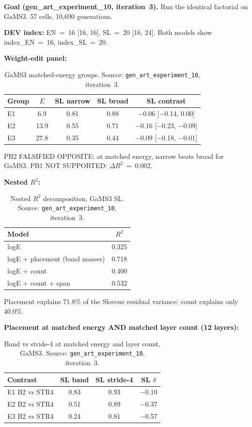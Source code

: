 \documentclass[11pt,letterpaper]{article}
\begin{document}
\textbf{Goal (gen\_art\_experiment\_10, iteration~3).} Run the identical factorial on GaMS3. 57 cells, 10,690 generations.

\textbf{DEV index:} EN~=~16 [16, 16], SL~=~20 [16, 24]. Both models show index\_EN~=~16, index\_SL~=~20.

\textbf{Weight-edit panel:}

\begin{table}[!htbp]
\centering
\caption{GaMS3 matched-energy groups. Source: \texttt{gen\_art\_experiment\_10}, iteration~3.}
\label{tab:exp10_matched}
\small
\begin{tabular}{lcccc}
\toprule
Group & $E$ & SL narrow & SL broad & SL contrast \\
\midrule
E1 & 6.9 & 0.81 & 0.88 & $-$0.06 [$-$0.14, 0.00] \\
E2 & 13.9 & 0.55 & 0.71 & $-$0.16 [$-$0.23, $-$0.09] \\
E3 & 27.8 & 0.35 & 0.44 & $-$0.09 [$-$0.18, $-$0.01] \\
\bottomrule
\end{tabular}
\end{table}

PB2 FALSIFIED OPPOSITE: at matched energy, narrow beats broad for GaMS3. PB1 NOT SUPPORTED: $\Delta R^2$~=~0.002.

\textbf{Nested $R^2$:}

\begin{table}[!htbp]
\centering
\caption{Nested $R^2$ decomposition, GaMS3 SL. Source: \texttt{gen\_art\_experiment\_10}, iteration~3.}
\label{tab:exp10_nested}
\small
\begin{tabular}{lc}
\toprule
Model & $R^2$ \\
\midrule
logE & 0.325 \\
logE + placement (band masses) & 0.718 \\
logE + count & 0.400 \\
logE + count + span & 0.532 \\
\bottomrule
\end{tabular}
\end{table}

Placement explains 71.8\% of the Slovene residual variance; count explains only 40.0\%.

\textbf{Placement at matched energy AND matched layer count (12 layers):}

\begin{table}[!htbp]
\centering
\caption{Band vs stride-4 at matched energy and layer count, GaMS3. Source: \texttt{gen\_art\_experiment\_10}, iteration~3.}
\label{tab:exp10_placement}
\small
\begin{tabular}{lccc}
\toprule
Contrast & SL band & SL stride-4 & SL $\delta$ \\
\midrule
E1 B2 vs STR4 & 0.83 & 0.93 & $-$0.10 \\
E2 B2 vs STR4 & 0.51 & 0.89 & $-$0.37 \\
E3 B2 vs STR4 & 0.24 & 0.81 & $-$0.57 \\
\bottomrule
\end{tabular}
\end{table}
\end{document}

